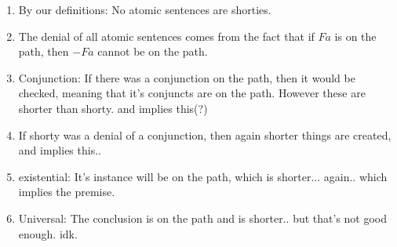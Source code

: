 \begin{enumerate}
\item By our definitions: No atomic sentences are shorties.
\item The denial of all atomic sentences comes from the fact that if $Fa$ is on the path, then $-Fa$ cannot be on the path.
\item Conjunction: If there was a conjunction on the path, then it would be checked, meaning that it's conjuncts are on the path. However these are shorter than shorty. and implies this(?)
\item If shorty was a denial of a conjunction, then again shorter things are created, and implies this.. 
\item existential: It's instance will be on the path, which is shorter... again.. which implies the premise.
\item Universal: The conclusion is on the path and is shorter.. but that's not good enough. idk. 
\end{enumerate}



